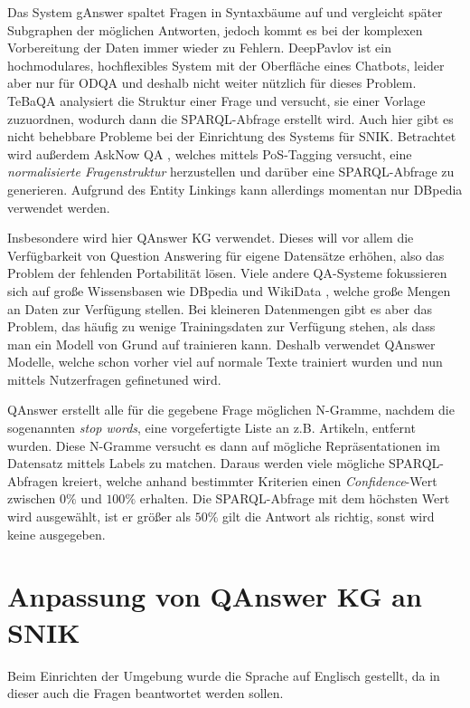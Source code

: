 \documentclass[utf8,biblatex]{lni}
\begin{document}
Das System gAnswer \cite{ganswer2} spaltet Fragen in Syntaxbäume auf und vergleicht später Subgraphen der möglichen Antworten, jedoch kommt es bei der komplexen Vorbereitung der Daten immer wieder zu Fehlern.
DeepPavlov \cite{deeppavlov} ist ein hochmodulares, hochflexibles System mit der Oberfläche eines Chatbots, leider aber nur für ODQA und deshalb nicht weiter nützlich für dieses Problem.
TeBaQA \cite{tebaqa} analysiert die Struktur einer Frage und versucht, sie einer Vorlage zuzuordnen, wodurch dann die SPARQL-Abfrage erstellt wird.
Auch hier gibt es nicht behebbare Probleme bei der Einrichtung des Systems für SNIK.
Betrachtet wird außerdem AskNow QA \cite{asknow}, welches mittels PoS-Tagging versucht, eine \emph{normalisierte Fragenstruktur} herzustellen und darüber eine SPARQL-Abfrage zu generieren.
Aufgrund des Entity Linkings kann allerdings momentan nur DBpedia verwendet werden.

Insbesondere wird hier QAnswer KG \cite{qanswer} verwendet.
Dieses will vor allem die Verfügbarkeit von Question Answering für eigene Datensätze erhöhen,
also das Problem der fehlenden Portabilität lösen.
Viele andere QA-Systeme fokussieren sich auf große Wissensbasen wie DBpedia und WikiData \cite{qald9plus},
welche große Mengen an Daten zur Verfügung stellen.
Bei kleineren Datenmengen gibt es aber das Problem, das häufig zu wenige Trainingsdaten zur Verfügung stehen, als dass man ein Modell von Grund auf trainieren kann.
Deshalb verwendet QAnswer Modelle, welche schon vorher viel auf normale Texte trainiert wurden und nun mittels Nutzerfragen gefinetuned wird.

QAnswer erstellt alle für die gegebene Frage möglichen N-Gramme, nachdem die sogenannten \emph{stop words}, eine vorgefertigte Liste an z.B. Artikeln, entfernt wurden.
Diese N-Gramme versucht es dann auf mögliche Repräsentationen im Datensatz mittels Labels zu matchen.
Daraus werden viele mögliche SPARQL-Abfragen kreiert, welche anhand bestimmter Kriterien einen \emph{Confidence}-Wert zwischen $0\%$ und $100\%$ erhalten.
Die SPARQL-Abfrage mit dem höchsten Wert wird ausgewählt, ist er größer als $50\%$ gilt die Antwort als richtig, sonst wird keine ausgegeben.

\section{Anpassung von QAnswer KG an SNIK}

Beim Einrichten der Umgebung wurde die Sprache auf Englisch gestellt, da in dieser auch die Fragen beantwortet werden sollen.
\end{document}
